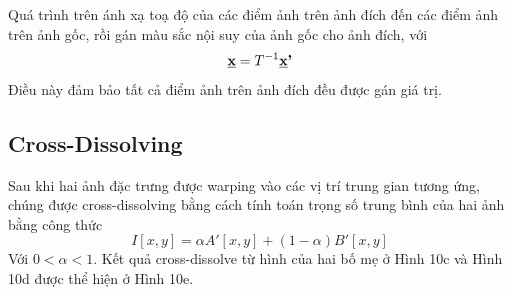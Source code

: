 \documentclass[journal]{IEEEtran}
\begin{document}
Quá trình trên ánh xạ toạ độ của các điểm ảnh trên ảnh đích đến các điểm ảnh trên ảnh gốc, rồi gán màu sắc nội suy của ảnh gốc cho ảnh đích, với \[\textbf{\underline{x}} = T^{-1}\textbf{\underline{x}'}\]
Điều này đảm bảo tất cả điểm ảnh trên ảnh đích đều được gán giá trị.

\subsection{Cross-Dissolving}
Sau khi hai ảnh đặc trưng được warping vào các vị trí trung gian tương ứng, chúng được cross-dissolving bằng cách tính toán trọng số trung bình của hai ảnh bằng công thức
\[I[x,y]=\alpha A'[x,y]+(1-\alpha) B'[x,y]\]
Với $0 < \alpha < 1$. Kết quả cross-dissolve từ hình của hai bố mẹ ở Hình 10c và Hình 10d được thể hiện ở Hình 10e.
\end{document}
